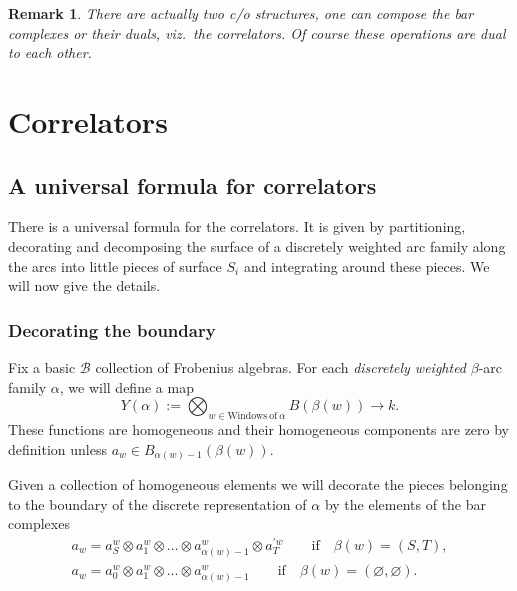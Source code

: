 \documentclass[11pt]{article}
\newtheorem{rmk}[thm]{Remark}
\def\calB{{\mathcal B}}
\def\oto{\otimes \dots \otimes}
\begin{document}
\begin{rmk}
There are actually two c/o structures, one can compose the bar
complexes or their duals, viz.\ the correlators. Of course these
operations are dual to each other.
\end{rmk}


\section{Correlators}
\label{corsection}

\subsection{A universal formula for  correlators}
 There is a universal formula for the correlators. It is given by partitioning, decorating
and  de\-com\-posing the surface of a discretely weighted arc family
  along the arcs into little pieces of surface $S_i$ and integrating around
these pieces. We will now give the details.



\subsubsection{Decorating the boundary}
Fix a basic $\calB$ collection of Frobenius algebras.  For each {\em
discretely weighted} $\beta$-arc family $\alpha$,  we will def\/ine a
map
\[
Y(\alpha):= \bigotimes_{w \in \mathrm {Windows~of~}\alpha}B(\beta(w))\to k.
\]
These functions are homogeneous and their homogeneous components  are  zero by def\/inition unless
 $a_w\in B_{\alpha(w)-1}(\beta(w)) $.

Given a collection of homogeneous elements
we will decorate the pieces belonging to the boundary of the discrete representation of $\alpha$ by
the elements of the bar complexes
\begin{gather*}
a_w = a^w_S\otimes a_1^w \oto a^w_{\alpha(w)-1}\otimes a_T^{\prime w} \qquad \text{if} \quad \beta(w)=(S,T),\\
a_w = a^w_0\otimes a_1^w \oto a^w_{\alpha(w)-1}  \qquad \text{if} \quad
\beta(w)=(\varnothing,\varnothing).
\end{gather*}
\end{document}

